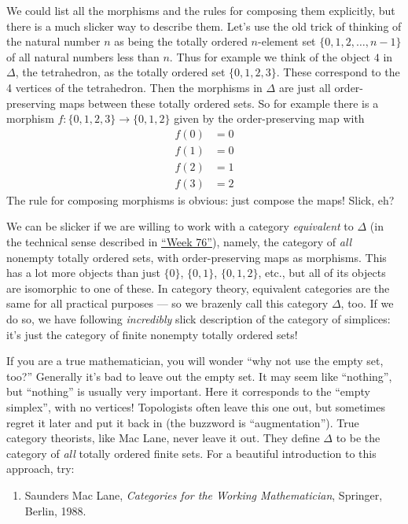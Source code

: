 \documentclass{article}
\def\tightlist{}
\begin{document}
We could list all the morphisms and the rules for composing them
explicitly, but there is a much slicker way to describe them. Let's use
the old trick of thinking of the natural number \(n\) as being the
totally ordered \(n\)-element set \(\{0,1,2,\ldots,n-1\}\) of all
natural numbers less than \(n\). Thus for example we think of the object
\(4\) in \(\Delta\), the tetrahedron, as the totally ordered set
\(\{0,1,2,3\}\). These correspond to the 4 vertices of the tetrahedron.
Then the morphisms in \(\Delta\) are just all order-preserving maps
between these totally ordered sets. So for example there is a morphism
\(f\colon\{0,1,2,3\}\to\{0,1,2\}\) given by the order-preserving map
with \[
  \begin{aligned}
    f(0)&=0
  \\f(1)&=0
  \\f(2)&=1
  \\f(3)&=2
  \end{aligned}
\] The rule for composing morphisms is obvious: just compose the maps!
Slick, eh?

We can be slicker if we are willing to work with a category
\emph{equivalent} to \(\Delta\) (in the technical sense described in
\protect\hyperlink{week76}{``Week 76''}), namely, the category of
\emph{all} nonempty totally ordered sets, with order-preserving maps as
morphisms. This has a lot more objects than just \(\{0\}\), \(\{0,1\}\),
\(\{0,1,2\}\), etc., but all of its objects are isomorphic to one of
these. In category theory, equivalent categories are the same for all
practical purposes --- so we brazenly call this category \(\Delta\),
too. If we do so, we have following \emph{incredibly} slick description
of the category of simplices: it's just the category of finite nonempty
totally ordered sets!

If you are a true mathematician, you will wonder ``why not use the empty
set, too?'' Generally it's bad to leave out the empty set. It may seem
like ``nothing'', but ``nothing'' is usually very important. Here it
corresponds to the ``empty simplex'', with no vertices! Topologists
often leave this one out, but sometimes regret it later and put it back
in (the buzzword is ``augmentation''). True category theorists, like Mac
Lane, never leave it out. They define \(\Delta\) to be the category of
\emph{all} totally ordered finite sets. For a beautiful introduction to
this approach, try:

\begin{enumerate}
\def\labelenumi{\arabic{enumi})}
\setcounter{enumi}{2}
\tightlist
\item
  Saunders Mac Lane, \emph{Categories for the Working Mathematician},
  Springer, Berlin, 1988.
\end{enumerate}
\end{document}
